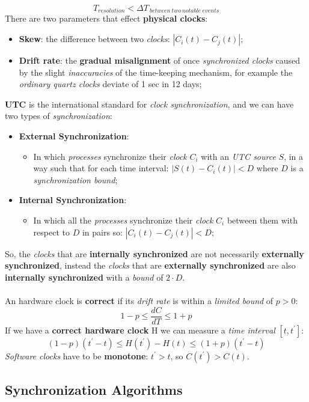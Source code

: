 \documentclass{article}
\begin{document}
\[T_{resolution} < \Delta T_{\:between\: two\: notable\: events}\]
There are two parameters that effect \textbf{physical clocks}:
\begin{itemize}
\item \textbf{Skew}: the difference between two \emph{clocks}: $\left | C_i(t) - C_j(t) \right |$;
\item \textbf{Drift rate}: the \textbf{gradual misalignment} of once \emph{synchronized clocks} caused by the slight \emph{inaccuracies} of the time-keeping mechanism, for example the \emph{ordinary quartz clocks} deviate of 1 sec in 12 days;
\clearpage
\end{itemize}
\textbf{UTC} is the international standard for \emph{clock synchronization}, and we can have two types of \emph{synchronization}:
\begin{itemize}
\item \textbf{External Synchronization}:  
\begin{itemize}
\item In which \emph{processes} synchronize their \emph{clock} $C_i$ with an \emph{UTC source} $S$, in a way such that for each time interval: $\left | S(t) - C_i(t) \right | < D$ where $D$ is a \emph{synchronization bound};
\end{itemize}
\item \textbf{Internal Synchronization}:
\begin{itemize}
\item In which all the \emph{processes} synchronize their \emph{clock} $C_i$ between them with respect to $D$ in pairs so: $\left | C_i(t) - C_j(t) \right | < D$;
\end{itemize}
\end{itemize}
So, the \emph{clocks} that are \textbf{internally synchronized} are not necessarily \textbf{externally synchronized}, instead the \emph{clocks} that are \textbf{externally synchronized} are also \textbf{internally synchronized} with a \emph{bound} of $2\cdot D$. \\\\
An hardware clock is \textbf{correct} if its \emph{drift rate} is within a \emph{limited bound} of $p>0$:
\[1-p \leq \frac{dC}{dT} \leq 1+p\]
If we have a \textbf{correct hardware clock} H we can measure a \emph{time interval} $\left [ t, t^{'} \right ]$: 
\[(1-p)(t^{'}-t) \leq H(t^{'}) - H(t) \leq (1+p)(t^{'}-t)\]
\emph{Software clocks} have to be \textbf{monotone}: $t^{'} > t$, so $C(t^{'}) > C(t)$.
\subsection{Synchronization Algorithms}
\end{document}
